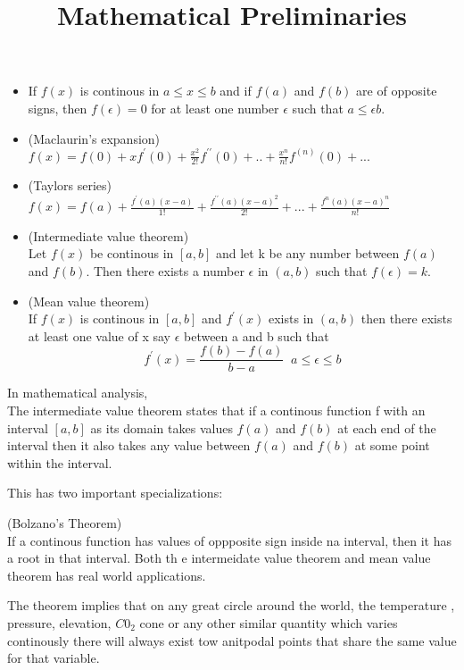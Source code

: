\documentclass{../template/texnote}
\title{Mathematical Preliminaries}
\begin{document}
    \maketitle {}
    \begin{itemize}
        \item If $f(x)$ is continous in $a \le x \le b $ and if $f(a)$ and $f(b)$ are of opposite signs, then $f(\epsilon) = 0 $ for at least one number $ \epsilon $ such that $ a \le \epsilon b $.
        \item (Maclaurin's expansion) \\
            $ f(x) = f(0) + x f^{\prime}(0) + \frac{x^2}{2!} f^{\prime \prime}(0) + .. + \frac{x^n}{n!}f^{(n)}(0)+ ... $
        \item (Taylors series) \\
            $ f(x) = f(a) + \frac{f^{\prime}(a)(x-a)}{1!} + \frac{f^{\prime\prime}(a)(x-a)^2}{2!}+ ...+ \frac{f^{n}(a)(x-a)^n}{n!}$
        \item (Intermediate value theorem)\\
            Let $f(x)$ be continous in $[a,b]$ and let k be any number between $f(a)$ and $f(b)$. Then there exists a number $\epsilon$ in $(a,b)$ such that $f(\epsilon) = k$.
        \item (Mean value theorem)\\
            If $f(x)$ is continous in $[a,b]$ and $f^{\prime}(x)$ exists in $(a,b)$ then there exists at least one value of x say $\epsilon$ between a and b such that 
            $$ f^{\prime}(x) = \frac{f(b) - f(a)}{b - a}\;\; a \le \epsilon \le b $$
    \end{itemize}
    
    In mathematical analysis,  \\
    The intermediate value theorem states that if a continous function f with an interval $[a,b]$ as its domain takes values $f(a)$ and $f(b)$ at each end of the interval then it also takes any value between $f(a)$ and $f(b)$ at some point within the interval.

    This has two important specializations:

    (Bolzano's Theorem)\\
    If a continous function has values of oppposite sign inside na interval, then it has a root in that interval.
    Both th e intermeidate value theorem and mean value theorem has real world applications.

    The theorem implies that on any great circle around the world, the temperature , pressure, elevation, $C0_2$ cone or any other similar quantity which varies continously there will always exist tow anitpodal points that share the same value for that variable.
\end{document}
